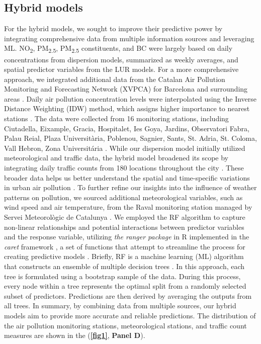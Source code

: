 \documentclass{article}
\begin{document}
\subsection{Hybrid models}
For the hybrid models, we sought to improve their predictive power by integrating comprehensive data from multiple information sources and leveraging ML. NO\textsubscript{2}, PM\textsubscript{2.5}, PM\textsubscript{2.5} constituents, and BC were largely based on daily concentrations from dispersion models, summarized as weekly averages, and spatial predictor variables from the LUR models. For a more comprehensive approach, we integrated additional data from the Catalan Air Pollution Monitoring and Forecasting Network (XVPCA) for Barcelona and surrounding areas \cite{xarxa2012}. Daily air pollution concentration levels were interpolated using the Inverse Distance Weighting (IDW) method, which assigns higher importance to nearest stations \cite{hoek2017methods}. The data were collected from 16 monitoring stations, including Ciutadella, Eixample, Gracia, Hospitalet, Ies Goya, Jardins, Observatori Fabra, Palau Reial, Plaza Universitària, Poblenou, Sagnier, Sants, St. Adria, St. Coloma, Vall Hebron, Zona Universitária \cite{xarxa2012}. While our dispersion model initially utilized meteorological and traffic data, the hybrid model broadened its scope by integrating daily traffic counts from 180 locations throughout the city \cite{trafficbcn}. These broader data helps us better understand the spatial and time-specific variations in urban air pollution \cite{pinto2020}. To further refine our insights into the influence of weather patterns on pollution, we sourced additional meteorological variables, such as wind speed and air temperature, from the Raval monitoring station managed by Servei Meteorològic de Catalunya \cite{xema2013}. We employed the RF algorithm to capture non-linear relationships and potential interactions between predictor variables and the response variable, utilizing \textit{the ranger package} in R implemented in the \textit{caret} framework \cite{wright2019}, a set of functions that attempt to streamline the process for creating predictive models \cite{caret2008}. Briefly, RF is a machine learning (ML) algorithm that constructs an ensemble of multiple decision trees \cite{breiman2001}. In this approach, each tree is formulated using a bootstrap sample of the data. During this process, every node within a tree represents the optimal split from a randomly selected subset of predictors. Predictions are then derived by averaging the outputs from all trees. In summary, by combining data from multiple sources, our hybrid models aim to provide more accurate and reliable predictions. The distribution of the air pollution monitoring stations, meteorological stations, and traffic count measures are shown in the (\textbf{\cref{fig1}}, \textbf{Panel D}). 
\end{document}
